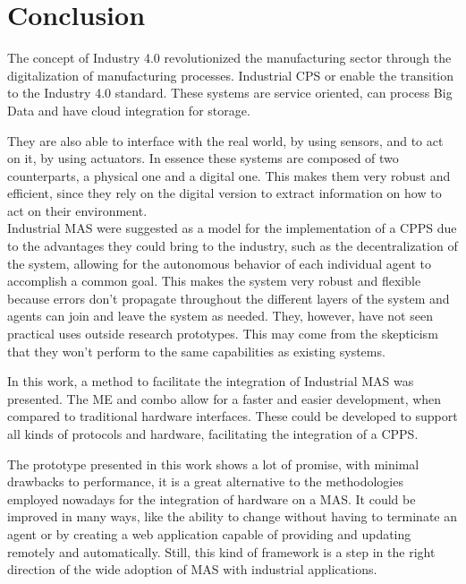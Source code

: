 


\glsresetall

\chapter{Conclusion}
\label{cha:conclusion}

The concept of Industry 4.0 revolutionized the manufacturing sector through the digitalization of manufacturing processes. Industrial \acrlong{CPS} or  enable the transition to the Industry 4.0 standard. These systems are service oriented, can process Big Data and have cloud integration for storage. 

They are also able to interface with the real world, by using sensors, and to act on it, by using actuators. In essence these systems are composed of two counterparts, a physical one and a digital one. This makes them very robust and efficient, since they rely on the digital version to extract information on how to act on their environment.\\

Industrial \acrlong{MAS} were suggested as a model for the implementation of a \acrlong{CPPS} due to the advantages they could bring to the industry, such as the decentralization of the system, allowing for the autonomous behavior of each individual agent to accomplish a common goal. This makes the system very robust and flexible because errors don't propagate throughout the different layers of the system and agents can join and leave the system as needed. They, however, have not seen practical uses outside research prototypes. This may come from the skepticism that they won't perform to the same capabilities as existing systems.

In this work, a method to facilitate the integration of Industrial \acrlong{MAS} was presented. The \acrlong{ME} and  combo allow for a faster and easier development, when compared to traditional hardware interfaces. These  could be developed to support all kinds of protocols and hardware, facilitating the integration of a \acrlong{CPPS}.

The prototype presented in this work shows a lot of promise, with minimal drawbacks to performance, it is a great alternative to the methodologies employed nowadays for the integration of hardware on a \acrlong{MAS}. It could be improved in many ways, like the ability to change  without having to terminate an agent or by creating a web application capable of providing and updating  remotely and automatically. Still, this kind of framework is a step in the right direction of the wide adoption of \acrlong{MAS} with industrial applications.